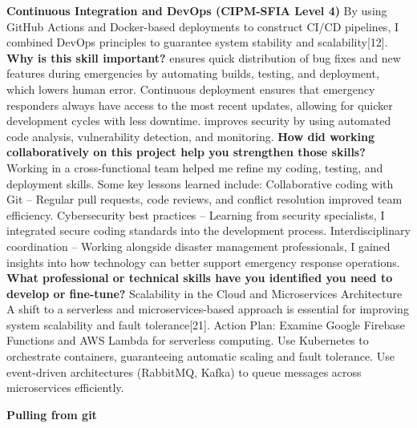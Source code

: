 \documentclass[../main.tex]{subfiles}
\begin{document}
\textbf{Continuous Integration and DevOps (CIPM-SFIA Level 4)}
By using GitHub Actions and Docker-based deployments to construct CI/CD pipelines, I combined DevOps principles to guarantee system stability and scalability[12].
\newline
\newline
\textbf{Why is this skill important?}
\newline
\newline
ensures quick distribution of bug fixes and new features during emergencies by automating builds, testing, and deployment, which lowers human error.
Continuous deployment ensures that emergency responders always have access to the most recent updates, allowing for quicker development cycles with less downtime.
improves security by using automated code analysis, vulnerability detection, and monitoring.
\newline
\newline
\textbf{How did working collaboratively on this project help you strengthen those skills?}
\newline
\newline
Working in a cross-functional team helped me refine my coding, testing, and deployment skills. Some key lessons learned include:
Collaborative coding with Git – Regular pull requests, code reviews, and conflict resolution improved team efficiency.
Cybersecurity best practices – Learning from security specialists, I integrated secure coding standards into the development process.
Interdisciplinary coordination – Working alongside disaster management professionals, I gained insights into how technology can better support emergency response operations.
\newline
\newline
\textbf{What professional or technical skills have you identified you need to develop or  fine-tune?}
\newline
\newline
Scalability in the Cloud and Microservices Architecture
A shift to a serverless and microservices-based approach is essential for improving system scalability and fault tolerance[21].
Action Plan: Examine Google Firebase Functions and AWS Lambda for serverless computing.
Use Kubernetes to orchestrate containers, guaranteeing automatic scaling and fault tolerance.
Use event-driven architectures (RabbitMQ, Kafka) to queue messages across microservices efficiently.
\newline

\textbf{Pulling from git}
\end{document}
